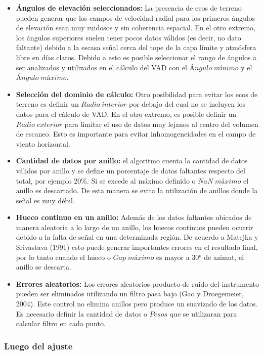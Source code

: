 \documentclass[12pt,spanish,oneside]{book}
\providecommand{\tightlist}{%
  \setlength{\itemsep}{0pt}\setlength{\parskip}{0pt}}
\begin{document}
\begin{itemize}
\tightlist
\item
  \textbf{Ángulos de elevación seleccionados:} La presencia de ecos de
  terreno pueden generar que los campos de velocidad radial para los
  primeros ángulos de elevación sean muy ruidosos y sin coherencia
  espacial. En el otro extremo, los ángulos superiores suelen tener
  pocos datos válidos (es decir, no dato faltante) debido a la escasa
  señal cerca del tope de la capa límite y atmósfera libre en días
  claros. Debido a esto es posible seleccionar el rango de ángulos a ser
  analizados y utilizados en el cálculo del VAD con el
  \(Ángulo \; mínimo\) y el \(Ángulo \; máximo\).
\item
  \textbf{Selección del dominio de cálculo:} Otro posibilidad para
  evitar los ecos de terreno es definir un \(Radio \; interior\) por
  debajo del cual no se incluyen los datos para el cálculo de VAD. En el
  otro extremo, es posible definir un \(Radio \; exterior\) para limitar
  el uso de datos muy lejanos al centro del volumen de escaneo. Esto es
  importante para evitar inhomogeneidades en el campo de viento
  horizontal.
\item
  \textbf{Cantidad de datos por anillo:} el algoritmo cuenta la cantidad
  de datos válidos por anillo y se define un porcentaje de datos
  faltantes respecto del total, por ejemplo 20\%. Si se excede al máximo
  definido o \(NaN \; máximo\) el anillo es descartado. De esta manera
  se evita la utilización de anillos donde la señal es muy débil.
\item
  \textbf{Hueco continuo en un anillo:} Además de los datos faltantes
  ubicados de manera aleatoria a lo largo de un anillo, los huecos
  continuos pueden ocurrir debido a la falta de señal en una determinada
  región. De acuerdo a Matejka y Srivastava (1991) esto puede generar
  importantes errores en el resultado final, por lo tanto cuando el
  hueco o \(Gap \; máximo\) es mayor a 30° de azimut, el anillo se
  descarta.
\item
  \textbf{Errores aleatorios:} Los errores aleatorios producto de ruido
  del instrumento pueden ser eliminados utilizando un filtro pasa bajo
  (Gao y Droegemeier, 2004). Este control no elimina anillos pero
  produce un suavizado de los datos. Es necesario definir la cantidad de
  datos o \(Pesos\) que se utilizaran para calcular filtro en cada
  punto.
\end{itemize}

\subsubsection{Luego del ajuste}\label{luego-del-ajuste}
\end{document}

